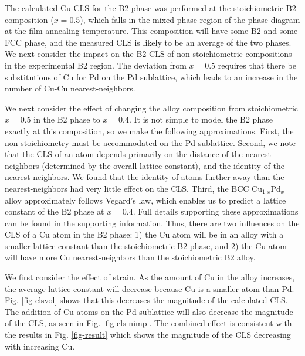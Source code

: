 \documentclass[number, sort&compress, review, 12pt]{elsarticle}
\begin{document}
The calculated Cu CLS for the B2 phase was performed at the stoichiometric B2 composition ($x = 0.5$), which falls in the mixed phase region of the phase diagram at the film annealing temperature. This composition will have some B2 and some FCC phase, and the measured CLS is likely to be an average of the two phases. We next consider the impact on the B2 CLS of non-stoichiometric compositions in the experimental B2 region. The deviation from $x = 0.5$ requires that there be substitutions of Cu for Pd on the Pd sublattice, which leads to an increase in the number of Cu-Cu nearest-neighbors.

We next consider the effect of changing the alloy composition from stoichiometric $x = 0.5$ in the B2 phase to $x = 0.4$. It is not simple to model the B2 phase exactly at this composition, so we make the following approximations. First, the non-stoichiometry must be accommodated on the Pd sublattice. Second, we note that the CLS of an atom depends primarily on the distance of the nearest-neighbors (determined by the overall lattice constant), and the identity of the nearest-neighbors. We found that the identity of atoms further away than the nearest-neighbors had very little effect on the CLS. Third, the BCC Cu$_{\text{1-}x}$Pd$_x$ alloy approximately follows Vegard's law, which enables us to predict a lattice constant of the B2 phase at $x = 0.4$. Full details supporting these approximations can be found in the supporting information. Thus, there are two influences on the CLS of a Cu atom in the B2 phase: 1) the Cu atom will be in an alloy with a smaller lattice constant than the stoichiometric B2 phase, and 2) the Cu atom will have more Cu nearest-neighbors than the stoichiometric B2 alloy.

We first consider the effect of strain. As the amount of Cu in the alloy increases, the average lattice constant will decrease because Cu is a smaller atom than Pd. Fig. \ref{fig-clsvol} shows that this decreases the magnitude of the calculated CLS. The addition of Cu atoms on the Pd sublattice will also decrease the magnitude of the CLS, as seen in Fig. \ref{fig-cls-nimp}. The combined effect is consistent with the results in Fig. \ref{fig-result} which shows the magnitude of the CLS decreasing with increasing Cu.
\end{document}
